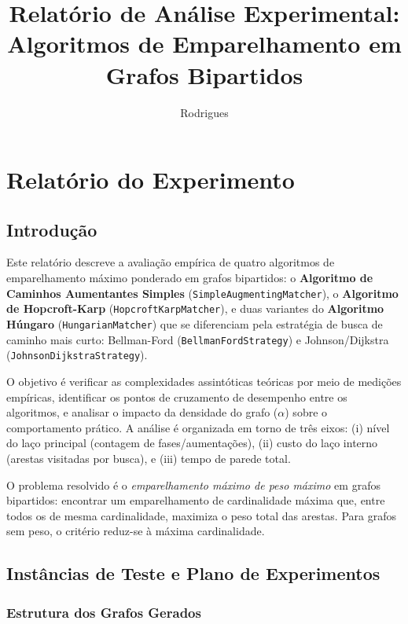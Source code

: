 \documentclass{infufrgs}
\title{Relatório de Análise Experimental: Algoritmos de Emparelhamento em Grafos Bipartidos}
\author{Rodrigues}{Juliana}
\begin{document}
\maketitle

\chapter{Relatório do Experimento}

\section{Introdução}

Este relatório descreve a avaliação empírica de quatro algoritmos de emparelhamento máximo ponderado em grafos bipartidos: o \textbf{Algoritmo de Caminhos Aumentantes Simples} (\texttt{SimpleAugmentingMatcher}), o \textbf{Algoritmo de Hopcroft-Karp} (\texttt{HopcroftKarpMatcher}), e duas variantes do \textbf{Algoritmo Húngaro} (\texttt{HungarianMatcher}) que se diferenciam pela estratégia de busca de caminho mais curto: Bellman-Ford (\texttt{BellmanFordStrategy}) e Johnson/Dijkstra (\texttt{JohnsonDijkstraStrategy}).

O objetivo é verificar as complexidades assintóticas teóricas por meio de medições empíricas, identificar os pontos de cruzamento de desempenho entre os algoritmos, e analisar o impacto da densidade do grafo ($\alpha$) sobre o comportamento prático. A análise é organizada em torno de três eixos: (i) nível do laço principal (contagem de fases/aumentações), (ii) custo do laço interno (arestas visitadas por busca), e (iii) tempo de parede total.

O problema resolvido é o \emph{emparelhamento máximo de peso máximo} em grafos bipartidos: encontrar um emparelhamento de cardinalidade máxima que, entre todos os de mesma cardinalidade, maximiza o peso total das arestas. Para grafos sem peso, o critério reduz-se à máxima cardinalidade.

\section{Instâncias de Teste e Plano de Experimentos}

\subsection{Estrutura dos Grafos Gerados}
\end{document}
